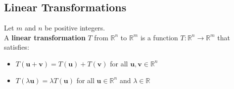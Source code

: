 \documentclass[a4paper, 9pt]{extarticle}
\begin{document}
\subsection*{Linear Transformations}
\begin{definitionbox}{}{}
  Let $m$ and $n$ be positive integers. \\[2ex]
  A \textbf{linear transformation} $T$ from $\mathbb{R}^n$ to $\mathbb{R}^m$ is a function $T:\mathbb{R}^n \to \mathbb{R}^m$ that satisfies:
  \begin{itemize}
    \item $T(\textbf{u} + \textbf{v}) = T(\textbf{u}) + T(\textbf{v})$ for all $\textbf{u}, \textbf{v} \in \mathbb{R}^n$
    \item $T(\lambda\textbf{u}) = \lambda T(\textbf{u})$ for all $\textbf{u} \in \mathbb{R}^n$ and $\lambda \in \mathbb{R}$
  \end{itemize}
\end{definitionbox}
\end{document}
